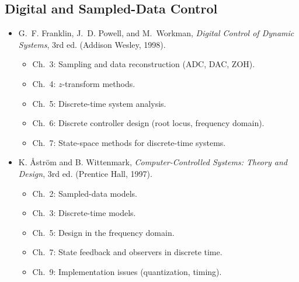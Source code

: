 \documentclass[11pt,a4paper]{article}
\begin{document}
	\subsection*{Digital and Sampled-Data Control}
	\begin{itemize}
		\item G.~F. Franklin, J.~D. Powell, and M.~Workman, \emph{Digital Control of Dynamic Systems}, 3rd ed. (Addison Wesley, 1998).  
		\begin{itemize}
			\item Ch.~3: Sampling and data reconstruction (ADC, DAC, ZOH).  
			\item Ch.~4: $z$-transform methods.  
			\item Ch.~5: Discrete-time system analysis.  
			\item Ch.~6: Discrete controller design (root locus, frequency domain).  
			\item Ch.~7: State-space methods for discrete-time systems.  
		\end{itemize}
		\item K. Åström and B. Wittenmark, \emph{Computer-Controlled Systems: Theory and Design}, 3rd ed. (Prentice Hall, 1997).  
		\begin{itemize}
			\item Ch.~2: Sampled-data models.  
			\item Ch.~3: Discrete-time models.  
			\item Ch.~5: Design in the frequency domain.  
			\item Ch.~7: State feedback and observers in discrete time.  
			\item Ch.~9: Implementation issues (quantization, timing).  
		\end{itemize}
	\end{itemize}
	
\end{document}
